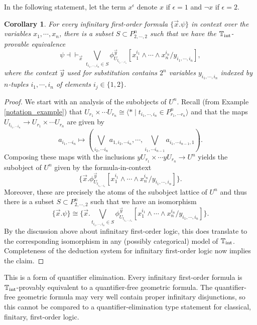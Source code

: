 \documentclass[a4paper]{amsproc}
\theoremstyle{plain}
\newtheorem{corollary}[theorem]{Corollary}
\theoremstyle{definition}
\theoremstyle{remark}
\numberwithin{equation}{section}
\newcommand{\y}{\textit{y}}
\begin{document}
In the following statement, let the term $x^{\epsilon}$ denote $x$ if $\epsilon = 1$ and $\neg x$ if $\epsilon = 2$.

\begin{corollary}
    For every infinitary first-order formula $\{\vec{x}. \psi\}$ in context over the variables $x_1,\cdots, x_n$, there is a subset $S \subset P^n_{2,\cdots,2}$ such that we have the $\mathbb{T}_{\textup{int}}$-provable equivalence
    \[
        \psi \dashv \vdash_{\vec{x}} \bigvee_{t_{i_1,\cdots,i_n} \in S} \phi^{\vec{y}}_{U_{t_{i_1,\cdots,i_n}}} [ x_1^{i_1} \wedge \cdots \wedge x_n^{i_n} / y_{i_1,\cdots, i_n}] ,
    \]
    where the context $\vec{y}$ used for substitution contains $2^n$ variables $y_{i_1,\cdots,i_n}$ indexed by $n$-tuples $i_1,\cdots,i_n$ of elements $i_j \in \{1,2\}$. 
\end{corollary}

\begin{proof}
    We start with an analysis of the subobjects of $U^n$. Recall (from Example \ref{notation_example}) that $U_{r_1} \times \cdots U_{r_n} \cong \langle * \mid t_{i_1,\cdots, i_n} \in P^n_{r_1,\cdots r_n} \rangle$ and that the maps $U_{t_{i_1,\cdots i_n}} \to U_{r_1} \times \cdots U_{r_n}$ are given by
    \[
        a_{i_1,\cdots i_n} \mapsto (\bigvee_{i_2,\cdots i_n} a_{1,i_2,\cdots i_n},\cdots, \bigvee_{i_1,\cdots i_{n - 1}} a_{i_1,\cdots i_{n - 1}, 1}) .
    \]
    Composing these maps with the inclusions $\y U_{r_1} \times \cdots \y U_{r_n} \to U^n$ yields the subobject of $U^n$ given by the formula-in-context
    \[
        \{ \vec{x} . \phi^{\vec{y}}_{U_{t_{i_1,\cdots i_n}}} [ x_1^{i_1} \wedge \cdots \wedge x_n^{i_n} / y_{i_1,\cdots, i_n}] \} .
    \]
    Moreover, these are precisely the atoms of the subobject lattice of $U^n$ and thus there is a subset $S \subset P^n_{2,\cdots,2}$ such that we have an isomorphism
    \[
        \{ \vec{x} . \psi \} \cong \{ \vec{x} . \bigvee_{t_{i_1,\cdots,i_n} \in S} \phi^{\vec{y}}_{U_{t_{i_1,\cdots,i_n}}} [ x_1^{i_1} \wedge \cdots \wedge x_n^{i_n} / y_{i_1,\cdots, i_n}] \} .
    \]
    By the discussion above about infinitary first-order logic, this does translate to the corresponding isomorphism in any (possibly categorical) model of $\mathbb{T}_{\textup{int}}$. Completeness of the deduction system for infinitary first-order logic now implies the claim.
\end{proof}

This is a form of quantifier elimination. Every infinitary first-order formula is $\mathbb{T}_{\textup{int}}$-provably equivalent to a quantifier-free geometric formula. The quantifier-free geometric formula may very well contain proper infinitary disjunctions, so this cannot be compared to a quantifier-elimination type statement for classical, finitary, first-order logic.
\end{document}

